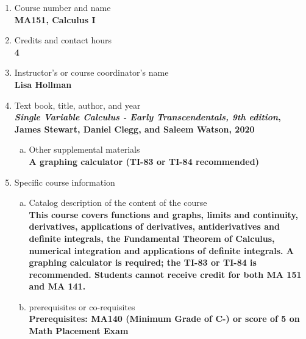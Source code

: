 \label{MA151}  %
\begin{enumerate}[1.]
\item Course number and name\\
  {\bfseries
    MA151, Calculus I    
  }
  
\item Credits and contact hours\\
  {\bfseries
    4  %
  }

\item Instructor's or course coordinator's name\\
  {\bfseries
    Lisa Hollman    
  }

\item Text book, title, author, and year\\
  {\bfseries
    {\em Single Variable Calculus - Early Transcendentals, 9th edition}, James Stewart, Daniel Clegg, and Saleem Watson, 2020
  }
\begin{enumerate}[a.]
\item Other supplemental materials\\
  {\bfseries
    A graphing calculator (TI-83 or TI-84 recommended)
  }
\end{enumerate}

\item Specific course information
\begin{enumerate}[a.]  
\item Catalog description of the content of the course\\
  {\bfseries
This course covers functions and graphs, limits and continuity, derivatives, applications of derivatives, antiderivatives and definite integrals, the Fundamental Theorem of Calculus, numerical integration and applications of definite integrals. A graphing calculator is required; the TI-83 or TI-84 is recommended. Students cannot receive credit for both MA 151 and MA 141.    
  }

\item prerequisites or co-requisites\\
  {\bfseries
    Prerequisites: MA140 (Minimum Grade of C-) or score of 5 on Math Placement Exam  %
  }


\end{enumerate}
\end{enumerate}
